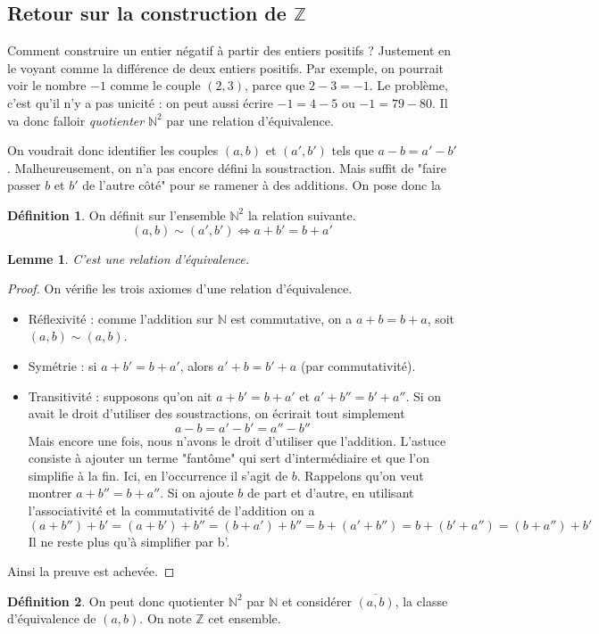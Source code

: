 \documentclass[french]{book}
\newcommand{\N}{\mathbb{N}}
\newcommand{\Z}{\mathbb{Z}}
\theoremstyle{plain}
\newtheorem{lem}{Lemme}[chapter]
\theoremstyle{definition}
\newtheorem{dfn}{Définition}[chapter]
\theoremstyle{remark}
\begin{document}
\subsection{Retour sur la construction de $\Z$}
Comment construire un entier négatif à partir des entiers positifs ? Justement en le voyant comme la différence de deux entiers positifs. Par exemple, on pourrait voir le nombre $-1$ comme le couple $(2,3)$, parce que $2 - 3 = -1$. Le problème, c'est qu'il n'y a pas unicité : on peut aussi écrire $-1 = 4 - 5$ ou $-1 = 79 - 80$. Il va donc falloir \textit{quotienter} $\N^2$ par une relation d'équivalence. \par
On voudrait donc identifier les couples $(a,b)$ et $(a',b')$ tels que $a - b = a' - b'$. Malheureusement, on n'a pas encore défini la soustraction. Mais suffit de "faire passer $b$ et $b'$ de l'autre côté" pour se ramener à des additions. On pose donc la
\begin{dfn}
	On définit sur l'ensemble $\N^2$ la relation suivante.
$$(a,b) \sim (a',b') \Leftrightarrow a + b' = b + a'$$
\end{dfn}
\begin{lem}
	C'est une relation d'équivalence.
\end{lem}
\begin{proof}
	On vérifie les trois axiomes d'une relation d'équivalence.
\begin{itemize}
	\item Réflexivité : comme l'addition sur $\N$ est commutative, on a $a + b = b + a$, soit $(a,b)\sim(a,b)$.
	\item Symétrie : si $a + b' = b + a'$, alors $a' + b = b' + a$ (par commutativité).
	\item Transitivité : supposons qu'on ait $a + b' = b + a'$ et $a' + b'' = b' + a''$. Si on avait le droit d'utiliser des soustractions, on écrirait tout simplement
	$$a - b = a' - b' = a'' - b''$$
	Mais encore une fois, nous n'avons le droit d'utiliser que l'addition. L'astuce consiste à ajouter un terme "fantôme" qui sert d'intermédiaire et que l'on simplifie à la fin. Ici, en l'occurrence il s'agit de $b$. Rappelons qu'on veut montrer $a + b'' = b + a''$. Si on ajoute $b$ de part et d'autre, en utilisant l'associativité et la commutativité de l'addition on a $$(a + b'') + b' = (a + b') + b'' = (b + a') + b'' = b + (a' + b'') = b + (b' + a'') = (b + a'') + b'$$ Il ne reste plus qu'à simplifier par b'.
\end{itemize}
Ainsi la preuve est achevée.
\end{proof}
\begin{dfn}
	On peut donc quotienter $\N^2$ par $\N$ et considérer $\overline{(a,b)}$, la classe d'équivalence de $(a,b)$. On note $\Z$ cet ensemble.
\end{dfn}
\end{document}
